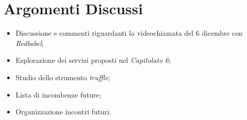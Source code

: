 \section{Argomenti Discussi}
	\begin{itemize}
		\item Discussione e commenti riguardanti la videochiamata del 6 dicembre con \textit{Redbabel};
		\item Esplorazione dei servizi proposti nel \textit{Capitolato 6};
        \item Studio dello strumento \textit{truffle};
        \item Lista di incombenze future;
		\item Organizzazione incontri futuri.
	\end{itemize}
